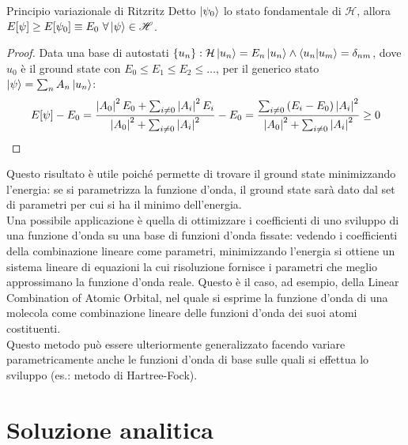 \begin{theorem}{Principio variazionale di Ritz}{ritz}
	Detto $ \ket{\psi_0} $ lo stato fondamentale di $ \mathcal{H} $, allora $ E[\psi] \ge E[\psi_0] \equiv E_0 \,\,\forall \ket{\psi} \in \mathscr{H} $.

	\tcblower
	\begin{proof}
		Data una base di autostati $ \{u_n\} : \mathcal{H} \ket{u_n} = E_n \ket{u_n} \land \braket{u_n | u_m} = \delta_{nm} $, dove $ u_0 $ è il ground state con $ E_0 \le E_1 \le E_2 \le \dots $, per il generico stato $ \ket{\psi} = \sum_n A_n \ket{u_n} $:
		\begin{equation*}
			E[\psi] - E_0
			= \frac{\left\lvert A_0\right\rvert^2 E_0 + \sum_{i \neq 0} \left\lvert A_i\right\rvert^2 E_i}{\left\lvert A_0\right\rvert^2 + \sum_{i \neq 0} \left\lvert A_i\right\rvert^2} - E_0 = \frac{\sum_{i \neq 0} \left( E_i - E_0 \right) \left\lvert A_i\right\rvert^2}{\left\lvert A_0\right\rvert^2 + \sum_{i \neq 0} \left\lvert A_i\right\rvert^2} \ge 0
		\end{equation*}
	\end{proof}
\end{theorem}

Questo risultato è utile poiché permette di trovare il ground state minimizzando l'energia: se si parametrizza la funzione d'onda, il ground state sarà dato dal set di parametri per cui si ha il minimo dell'energia.\\
Una possibile applicazione è quella di ottimizzare i coefficienti di uno sviluppo di una funzione d'onda su una base di funzioni d'onda fissate: vedendo i coefficienti della combinazione lineare come parametri, minimizzando l'energia si ottiene un sistema lineare di equazioni la cui risoluzione fornisce i parametri che meglio approssimano la funzione d'onda reale. Questo è il caso, ad esempio, della Linear Combination of Atomic Orbital, nel quale si esprime la funzione d'onda di una molecola come combinazione lineare delle funzioni d'onda dei suoi atomi costituenti.\\
Questo metodo può essere ulteriormente generalizzato facendo variare parametricamente anche le funzioni d'onda di base sulle quali si effettua lo sviluppo (es.: metodo di Hartree-Fock).

\section{Soluzione analitica}

